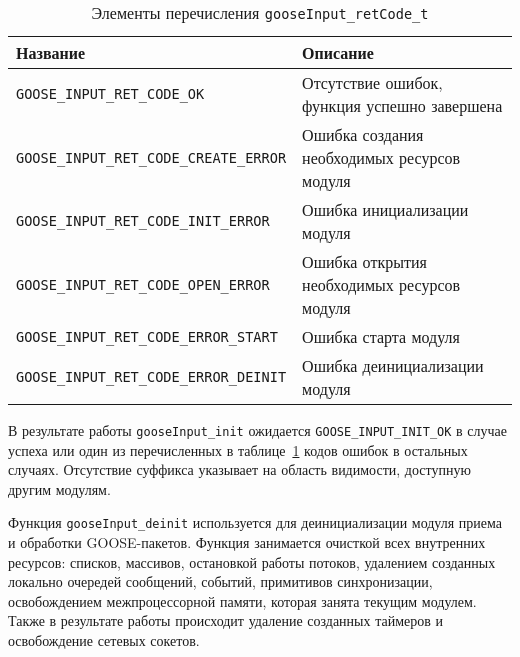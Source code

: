 \begin{table}[ht]
    \caption{Элементы перечисления \lstinline{gooseInput_retCode_t}}
    \label{table:func:gooseInputRetCodeElems}
    \begin{tabular}{| >{\raggedright}m{}
                    | >{\raggedright\arraybackslash}m{}|}
        \hline
        \centering Название & \centering\arraybackslash Описание \\

        \hline
        \lstinline[]$GOOSE_INPUT_RET_CODE_OK$ &
        Отсутствие ошибок, функция успешно завершена
        \\

        \hline
        \lstinline[]$GOOSE_INPUT_RET_CODE_CREATE_ERROR$ &
        Ошибка создания необходимых ресурсов модуля
        \\

        \hline
        \lstinline[]$GOOSE_INPUT_RET_CODE_INIT_ERROR$ &
        Ошибка инициализации модуля
        \\

        \hline
        \lstinline[]$GOOSE_INPUT_RET_CODE_OPEN_ERROR$ &
        Ошибка открытия необходимых ресурсов модуля
        \\

        \hline
        \lstinline[]$GOOSE_INPUT_RET_CODE_ERROR_START$ &
        Ошибка старта модуля
        \\

        \hline
        \lstinline[]$GOOSE_INPUT_RET_CODE_ERROR_DEINIT$ &
        Ошибка деинициализации модуля
        \\

        \hline
    \end{tabular}
\end{table}

В результате работы \lstinline{gooseInput_init} ожидается
\lstinline{GOOSE_INPUT_INIT_OK} в случае успеха или один из перечисленных
в таблице~\ref{table:func:gooseInputRetCodeElems} кодов ошибок в остальных
случаях.
Отсутствие суффикса указывает на область видимости, доступную другим модулям.

Функция \lstinline{gooseInput_deinit} используется для деинициализации модуля приема и обработки GOOSE-пакетов. Функция занимается очисткой всех внутренних ресурсов:
списков, массивов, остановкой работы потоков, удалением созданных локально очередей сообщений, событий, примитивов синхронизации, освобождением межпроцессорной памяти, которая занята текущим модулем.
Также в результате работы происходит удаление созданных таймеров и освобождение
сетевых сокетов.


